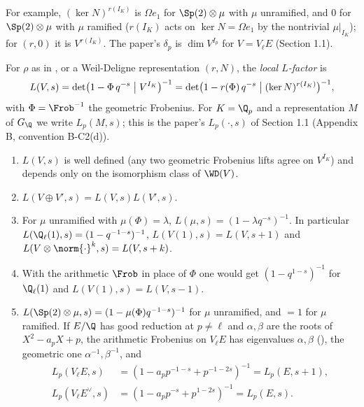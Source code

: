 For example, $(\ker N)^{r(I_K)}$ is $\Omega e_1$ for $\Sp(2)\otimes\mu$ with $\mu$ unramified, and $0$ for $\Sp(2)\otimes\mu$ with $\mu$ ramified ($r(I_K)$ acts on $\ker N=\Omega e_1$ by the
nontrivial $\mu|_{I_K}$); for $(r,0)$ it is $V^{r(I_K)}$. The paper's $\delta_p$ is $\dim V^{I_p}$ for $V=V_\ell E$ (Section 1.1).

\begin{definition}\label{def:local:L-factor}
For $\rho$ as in , or a Weil-Deligne representation $(r,N)$, the \emph{local $L$-factor} is
\[
L(V,s)=\det\bigl(1-\Phi\,q^{-s}\bigm|V^{I_K}\bigr)^{-1}=\det\bigl(1-r(\Phi)\,q^{-s}\bigm|(\ker N)^{r(I_K)}\bigr)^{-1},
\]
with $\Phi=\Frob^{-1}$ the geometric Frobenius.
For $K=\Q_p$ and a representation $M$ of $G_\Q$ we write $L_p(M,s)$; this is the paper's $L_p(\cdot,s)$ of Section 1.1 (Appendix B, convention B-C2(d)).
\end{definition}

\begin{proposition}\label{prop:local:L-factor}
\begin{enumerate}[label=(\roman*)]
\item $L(V,s)$ is well defined (any two geometric Frobenius lifts agree on $V^{I_K}$) and depends only on the isomorphism class of $\WD(V)$.
\item $L(V\oplus V',s)=L(V,s)L(V',s)$.
\item For $\mu$ unramified with $\mu(\Phi)=\lambda$, $L(\mu,s)=(1-\lambda q^{-s})^{-1}$. In particular $L(\Q_\ell(1),s)=(1-q^{-1-s})^{-1}$, $L(V(1),s)=L(V,s+1)$ and
$L(V\otimes\norm{\cdot}^k,s)=L(V,s+k)$.
\item With the arithmetic $\Frob$ in place of $\Phi$ one would get $(1-q^{1-s})^{-1}$ for $\Q_\ell(1)$ and $L(V(1),s)=L(V,s-1)$.
\item $L(\Sp(2)\otimes\mu,s)=(1-\mu(\Phi)q^{-1-s})^{-1}$ for $\mu$ unramified, and $=1$ for $\mu$ ramified. If $E/\Q$ has good reduction at $p\ne\ell$ and
$\alpha,\beta$ are the roots of $X^2-a_pX+p$, the arithmetic Frobenius on $V_\ell E$ has eigenvalues $\alpha,\beta$ (), the geometric one
$\alpha^{-1},\beta^{-1}$, and
\begin{align*}
L_p(V_\ell E,s)&=(1-a_pp^{-1-s}+p^{-1-2s})^{-1}=L_p(E,s+1),\\
L_p(V_\ell E^\vee,s)&=(1-a_pp^{-s}+p^{1-2s})^{-1}=L_p(E,s).
\end{align*}
\end{enumerate}
\end{proposition}

